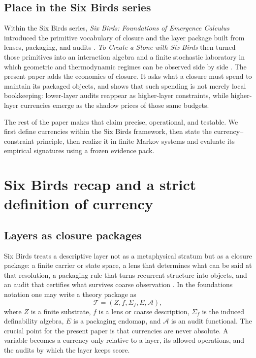 \documentclass[11pt,a4paper]{article}
\begin{document}
\subsection{Place in the Six Birds series}

Within the Six Birds series, \emph{Six Birds: Foundations of Emergence Calculus} introduced the primitive vocabulary of closure and the layer package built from lenses, packaging, and audits \cite{tsiokos2026sixbirds}. \emph{To Create a Stone with Six Birds} then turned those primitives into an interaction algebra and a finite stochastic laboratory in which geometric and thermodynamic regimes can be observed side by side \cite{tsiokos2026create}. The present paper adds the economics of closure. It asks what a closure must spend to maintain its packaged objects, and shows that such spending is not merely local bookkeeping: lower-layer audits reappear as higher-layer constraints, while higher-layer currencies emerge as the shadow prices of those same budgets.

The rest of the paper makes that claim precise, operational, and testable. We first define currencies within the Six Birds framework, then state the currency--constraint principle, then realize it in finite Markov systems and evaluate its empirical signatures using a frozen evidence pack.
 \section{Six Birds recap and a strict definition of currency}\label{sec:framework}

\subsection{Layers as closure packages}

Six Birds treats a descriptive layer not as a metaphysical stratum but as a closure package: a finite carrier or state space, a lens that determines what can be said at that resolution, a packaging rule that turns recurrent structure into objects, and an audit that certifies what survives coarse observation \cite{tsiokos2026sixbirds}. In the foundations notation one may write a theory package as
\[
\mathcal T=(Z,f,\Sigma_f,E,\mathcal A),
\]
where \(Z\) is a finite substrate, \(f\) is a lens or coarse description, \(\Sigma_f\) is the induced definability algebra, \(E\) is a packaging endomap, and \(\mathcal A\) is an audit functional. The crucial point for the present paper is that currencies are never absolute. A variable becomes a currency only relative to a layer, its allowed operations, and the audits by which the layer keeps score.
\end{document}
